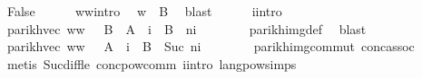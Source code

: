 \begin{isabellebody}
\ False\isanewline
\ \ \ \ \isamarkupfalse%
\ w{}{\isacharunderscore}{\kern0pt}w{}{\isacharunderscore}{\kern0pt}intro\ \isamarkupfalse%
\ {\isachardoublequoteopen}w{}\ {\isasymin}\ B{\isachardoublequoteclose}\ \isamarkupfalse%
\ blast\isanewline
\ \ \ \ \isamarkupfalse%
\ i{\isacharunderscore}{\kern0pt}intro\ \isamarkupfalse%
\ {\isachardoublequoteopen}parikh{\isacharunderscore}{\kern0pt}vec\ {\isacharparenleft}{\kern0pt}w{}{\isacharat}{\kern0pt}w{}{\isacharprime}{\kern0pt}{\isacharparenright}{\kern0pt}\ {\isasymin}\ {\isasymPsi}\ {\isacharparenleft}{\kern0pt}B\ {\isacharat}{\kern0pt}{\isacharat}{\kern0pt}\ A\ {\isacharcircum}{\kern0pt}{\isacharcircum}{\kern0pt}\ i\ {\isacharat}{\kern0pt}{\isacharat}{\kern0pt}\ B\ {\isacharcircum}{\kern0pt}{\isacharcircum}{\kern0pt}\ {\isacharparenleft}{\kern0pt}n{\isacharminus}{\kern0pt}i{\isacharparenright}{\kern0pt}{\isacharparenright}{\kern0pt}{\isachardoublequoteclose}\isanewline
\ \ \ \ \ \ \isamarkupfalse%
\ parikh{\isacharunderscore}{\kern0pt}img{\isacharunderscore}{\kern0pt}def\ \isamarkupfalse%
\ blast\isanewline
\ \ \ \ \isamarkupfalse%
\ \isamarkupfalse%
\ {\isachardoublequoteopen}parikh{\isacharunderscore}{\kern0pt}vec\ {\isacharparenleft}{\kern0pt}w{}{\isacharat}{\kern0pt}w{}{\isacharprime}{\kern0pt}{\isacharparenright}{\kern0pt}\ {\isasymin}\ {\isasymPsi}\ {\isacharparenleft}{\kern0pt}A\ {\isacharcircum}{\kern0pt}{\isacharcircum}{\kern0pt}\ i\ {\isacharat}{\kern0pt}{\isacharat}{\kern0pt}\ B\ {\isacharcircum}{\kern0pt}{\isacharcircum}{\kern0pt}\ {\isacharparenleft}{\kern0pt}Suc\ n{\isacharminus}{\kern0pt}i{\isacharparenright}{\kern0pt}{\isacharparenright}{\kern0pt}{\isachardoublequoteclose}\isanewline
\ \ \ \ \ \ \isamarkupfalse%
\ parikh{\isacharunderscore}{\kern0pt}img{\isacharunderscore}{\kern0pt}commut\ conc{\isacharunderscore}{\kern0pt}assoc\isanewline
\ \ \ \ \ \ \isamarkupfalse%
\ {\isacharparenleft}{\kern0pt}metis\ Suc{\isacharunderscore}{\kern0pt}diff{\isacharunderscore}{\kern0pt}le\ conc{\isacharunderscore}{\kern0pt}pow{\isacharunderscore}{\kern0pt}comm\ i{\isacharunderscore}{\kern0pt}intro\ lang{\isacharunderscore}{\kern0pt}pow{\isachardot}{\kern0pt}simps{\isacharparenleft}{\kern0pt}{}{\isacharparenright}{\kern0pt}{\isacharparenright}{\kern0pt}\isanewline
\ \ \ \ \isamarkupfalse%

\end{isabellebody}
